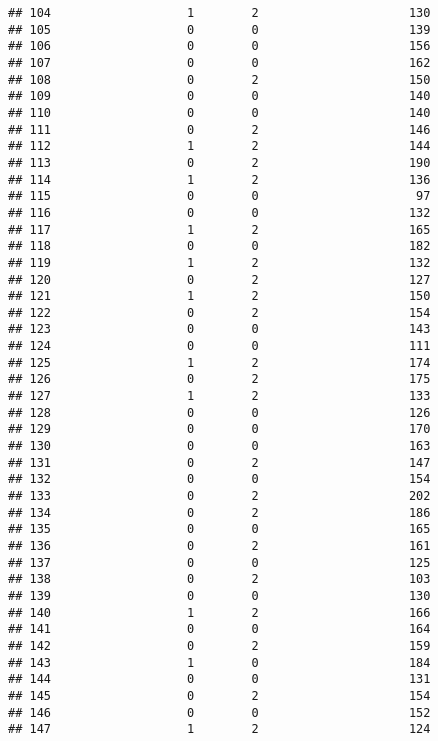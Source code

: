 \documentclass[]{article}
\begin{document}
\begin{verbatim}
## 104                   1        2                     130
## 105                   0        0                     139
## 106                   0        0                     156
## 107                   0        0                     162
## 108                   0        2                     150
## 109                   0        0                     140
## 110                   0        0                     140
## 111                   0        2                     146
## 112                   1        2                     144
## 113                   0        2                     190
## 114                   1        2                     136
## 115                   0        0                      97
## 116                   0        0                     132
## 117                   1        2                     165
## 118                   0        0                     182
## 119                   1        2                     132
## 120                   0        2                     127
## 121                   1        2                     150
## 122                   0        2                     154
## 123                   0        0                     143
## 124                   0        0                     111
## 125                   1        2                     174
## 126                   0        2                     175
## 127                   1        2                     133
## 128                   0        0                     126
## 129                   0        0                     170
## 130                   0        0                     163
## 131                   0        2                     147
## 132                   0        0                     154
## 133                   0        2                     202
## 134                   0        2                     186
## 135                   0        0                     165
## 136                   0        2                     161
## 137                   0        0                     125
## 138                   0        2                     103
## 139                   0        0                     130
## 140                   1        2                     166
## 141                   0        0                     164
## 142                   0        2                     159
## 143                   1        0                     184
## 144                   0        0                     131
## 145                   0        2                     154
## 146                   0        0                     152
## 147                   1        2                     124

\end{verbatim}
\end{document}

